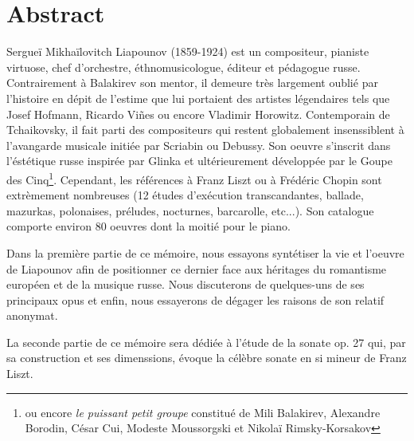 
\chapter*{Abstract}

Sergueï Mikhaïlovitch Liapounov (1859-1924) est un compositeur, pianiste virtuose,
chef d'orchestre, éthnomusicologue, éditeur et pédagogue russe. Contrairement à
Balakirev son mentor, il demeure très largement oublié par l'histoire en dépit
de l'estime que lui portaient des artistes légendaires tels que Josef Hofmann,
Ricardo Vi\~{n}es ou encore Vladimir Horowitz.
Contemporain de Tchaikovsky, il fait parti des compositeurs qui restent globalement
insenssiblent à l'avangarde musicale initiée par Scriabin ou Debussy. Son oeuvre
s'inscrit dans l'éstétique russe inspirée par Glinka et ultérieurement développée
par le Goupe des Cinq\footnote{ou encore \emph{le puissant petit groupe} constitué
de Mili Balakirev, Alexandre Borodin, César Cui, Modeste Moussorgski et Nikolaï
Rimsky-Korsakov}. Cependant, les références à Franz Liszt ou à Frédéric Chopin
sont extrèmement nombreuses (12 études d'exécution transcandantes, ballade,
mazurkas, polonaises, préludes, nocturnes, barcarolle, etc...). Son catalogue
comporte environ 80 oeuvres dont la moitié pour le piano.

Dans la première partie de ce mémoire, nous essayons syntétiser la vie et
l'oeuvre de Liapounov afin de positionner ce dernier face aux héritages du
romantisme européen et de la musique russe. Nous discuterons de quelques-uns
de ses principaux opus et enfin, nous essayerons de dégager les raisons de son
relatif anonymat.

La seconde partie de ce mémoire sera dédiée à l'étude de la sonate op. 27 qui,
par sa construction et ses dimenssions, évoque la célèbre sonate en si mineur
de Franz Liszt.

